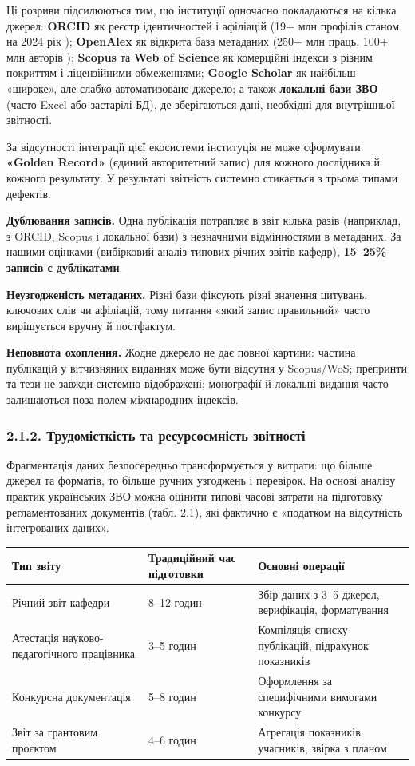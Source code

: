 Ці розриви підсилюються тим, що інституції одночасно покладаються на кілька джерел: \textbf{ORCID} як реєстр ідентичностей і афіліацій (19+ млн профілів станом на 2024 рік \cite{ORCID2024APIDocs}); \textbf{OpenAlex} як відкрита база метаданих (250+ млн праць, 100+ млн авторів \cite{Priem2022OpenAlex,OpenAlex2024Docs}); \textbf{Scopus} та \textbf{Web of Science} як комерційні індекси з різним покриттям і ліцензійними обмеженнями; \textbf{Google Scholar} як найбільш «широке», але слабко автоматизоване джерело; а також \textbf{локальні бази ЗВО} (часто Excel або застарілі БД), де зберігаються дані, необхідні для внутрішньої звітності.

За відсутності інтеграції цієї екосистеми інституція не може сформувати \textbf{«Golden Record»} (єдиний авторитетний запис) для кожного дослідника й кожного результату. У результаті звітність системно стикається з трьома типами дефектів.

\textbf{Дублювання записів.} Одна публікація потрапляє в звіт кілька разів (наприклад, з ORCID, Scopus і локальної бази) з незначними відмінностями в метаданих. За нашими оцінками (вибірковий аналіз типових річних звітів кафедр), \textbf{15--25\% записів є дублікатами}.

\textbf{Неузгодженість метаданих.} Різні бази фіксують різні значення цитувань, ключових слів чи афіліацій, тому питання «який запис правильний» часто вирішується вручну й постфактум.

\textbf{Неповнота охоплення.} Жодне джерело не дає повної картини: частина публікацій у вітчизняних виданнях може бути відсутня у Scopus/WoS; препринти та тези не завжди системно відображені; монографії й локальні видання часто залишаються поза полем міжнародних індексів.

\subsubsection*{2.1.2. Трудомісткість та ресурсоємність звітності}

Фрагментація даних безпосередньо трансформується у витрати: що більше джерел та форматів, то більше ручних узгоджень і перевірок. На основі аналізу практик українських ЗВО можна оцінити типові часові затрати на підготовку регламентованих документів (табл. 2.1), які фактично є «податком на відсутність інтегрованих даних».

\begin{longtable}{@{}p{}p{}p{}@{}}
\toprule
\textbf{Тип звіту} & \textbf{Традиційний час підготовки} & \textbf{Основні операції} \\
\midrule
Річний звіт кафедри & 8--12 годин & Збір даних з 3--5 джерел, верифікація, форматування \\
Атестація науково-педагогічного працівника & 3--5 годин & Компіляція списку публікацій, підрахунок показників \\
Конкурсна документація & 5--8 годин & Оформлення за специфічними вимогами конкурсу \\
Звіт за грантовим проєктом & 4--6 годин & Агрегація показників учасників, звірка з планом \\
\bottomrule
\end{longtable}

